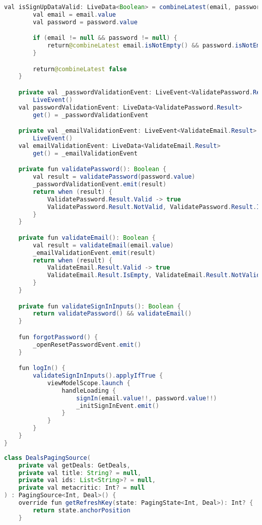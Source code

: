 \begin{asection}
\begin{lstlisting}[language=Java,label={lst:add:a_6}, caption={AuthSignInViewModel}]
    val isSignUpDataValid: LiveData<Boolean> = combineLatest(email, password) {
        val email = email.value
        val password = password.value

        if (email != null && password != null) {
            return@combineLatest email.isNotEmpty() && password.isNotEmpty()
        }

        return@combineLatest false
    }

    private val _passwordValidationEvent: LiveEvent<ValidatePassword.Result> =
        LiveEvent()
    val passwordValidationEvent: LiveData<ValidatePassword.Result>
        get() = _passwordValidationEvent

    private val _emailValidationEvent: LiveEvent<ValidateEmail.Result> =
        LiveEvent()
    val emailValidationEvent: LiveData<ValidateEmail.Result>
        get() = _emailValidationEvent

    private fun validatePassword(): Boolean {
        val result = validatePassword(password.value)
        _passwordValidationEvent.emit(result)
        return when (result) {
            ValidatePassword.Result.Valid -> true
            ValidatePassword.Result.NotValid, ValidatePassword.Result.IsEmpty -> false
        }
    }

    private fun validateEmail(): Boolean {
        val result = validateEmail(email.value)
        _emailValidationEvent.emit(result)
        return when (result) {
            ValidateEmail.Result.Valid -> true
            ValidateEmail.Result.IsEmpty, ValidateEmail.Result.NotValid -> false
        }
    }

    private fun validateSignInInputs(): Boolean {
        return validatePassword() && validateEmail()
    }

    fun forgotPassword() {
        _openResetPasswordEvent.emit()
    }

    fun logIn() {
        validateSignInInputs().applyIfTrue {
            viewModelScope.launch {
                handleLoading {
                    signIn(email.value!!, password.value!!)
                    _initSignInEvent.emit()
                }
            }
        }
    }
}
\end{lstlisting}
\begin{lstlisting}[language=Java,label={lst:add:a_10}, caption={DealsPagingSource}]
class DealsPagingSource(
    private val getDeals: GetDeals,
    private val title: String? = null,
    private val ids: List<String>? = null,
    private val metacritic: Int? = null
) : PagingSource<Int, Deal>() {
    override fun getRefreshKey(state: PagingState<Int, Deal>): Int? {
        return state.anchorPosition
    }


\end{lstlisting}
\end{asection}
